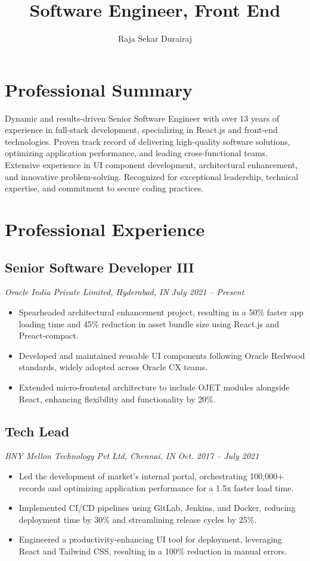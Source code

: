 \documentclass{article}
\title{Software Engineer, Front End}
\author{Raja Sekar Durairaj}
\date{}
\begin{document}
\maketitle

\section*{Professional Summary}
Dynamic and results-driven Senior Software Engineer with over 13 years of experience in full-stack development, specializing in React.js and front-end technologies. Proven track record of delivering high-quality software solutions, optimizing application performance, and leading cross-functional teams. Extensive experience in UI component development, architectural enhancement, and innovative problem-solving. Recognized for exceptional leadership, technical expertise, and commitment to secure coding practices.

\section*{Professional Experience}

\subsection*{Senior Software Developer III}
\textit{Oracle India Private Limited, Hyderabad, IN} \hfill \textit{July 2021 – Present}
\begin{itemize}[noitemsep]
    \item Spearheaded architectural enhancement project, resulting in a 50\% faster app loading time and 45\% reduction in asset bundle size using React.js and Preact-compact.
    \item Developed and maintained reusable UI components following Oracle Redwood standards, widely adopted across Oracle CX teams.
    \item Extended micro-frontend architecture to include OJET modules alongside React, enhancing flexibility and functionality by 20\%.
\end{itemize}

\subsection*{Tech Lead}
\textit{BNY Mellon Technology Pvt Ltd, Chennai, IN} \hfill \textit{Oct. 2017 – July 2021}
\begin{itemize}[noitemsep]
    \item Led the development of market's internal portal, orchestrating 100,000+ records and optimizing application performance for a 1.5x faster load time.
    \item Implemented CI/CD pipelines using GitLab, Jenkins, and Docker, reducing deployment time by 30\% and streamlining release cycles by 25\%.
    \item Engineered a productivity-enhancing UI tool for deployment, leveraging React and Tailwind CSS, resulting in a 100\% reduction in manual errors.
\end{itemize}
\end{document}
